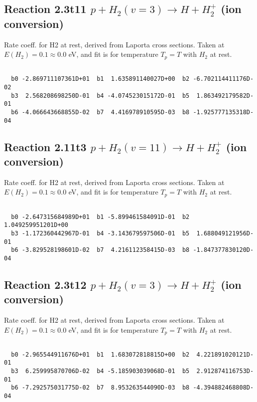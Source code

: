 \documentclass[12pt,dvipdfmx]{article}
\begin{document}
\newpage
\subsection{
Reaction 2.3t11
$ p + H_2(v=3) \rightarrow H + H_2^+$ (ion conversion)
}
Rate coeff. for H2 at rest, derived from Laporta cross sections.
Taken at $E(H_2) = 0.1 \approx 0.0$ eV,  and fit is for temperature $T_p=T$ with $H_2$ at rest.

\begin{small}\begin{verbatim}

  b0 -2.869711107361D+01  b1  1.635891140027D+00  b2 -6.702114411176D-02
  b3  2.568208698250D-01  b4 -4.074523015172D-01  b5  1.863492179582D-01
  b6 -4.066643668855D-02  b7  4.416978910595D-03  b8 -1.925777135318D-04

\end{verbatim}\end{small}

\newpage
\subsection{
Reaction 2.11t3
$ p + H_2(v=11) \rightarrow H + H_2^+$ (ion conversion)
}
Rate coeff. for H2 at rest, derived from Laporta cross sections.
Taken at $E(H_2) = 0.1 \approx 0.0$ eV,  and fit is for temperature $T_p=T$ with $H_2$ at rest.

\begin{small}\begin{verbatim}

  b0 -2.647315684989D+01  b1 -5.899461584091D-01  b2  1.049259951201D+00
  b3 -1.172360442967D-01  b4 -3.143679597506D-01  b5  1.688049121956D-01
  b6 -3.829528198601D-02  b7  4.216112358415D-03  b8 -1.847377830120D-04

\end{verbatim}\end{small}

\newpage
\subsection{
Reaction 2.3t12
$ p + H_2(v=3) \rightarrow H + H_2^+$ (ion conversion)
}
Rate coeff. for H2 at rest, derived from Laporta cross sections.
Taken at $E(H_2) = 0.1 \approx 0.0$ eV,  and fit is for temperature $T_p=T$ with $H_2$ at rest.

\begin{small}\begin{verbatim}

  b0 -2.965544911676D+01  b1  1.683072818815D+00  b2  4.221891020121D-01
  b3  6.259995870706D-02  b4 -5.185903039068D-01  b5  2.912874116753D-01
  b6 -7.292575031775D-02  b7  8.953263544090D-03  b8 -4.394882468808D-04

\end{verbatim}\end{small}
\end{document}
